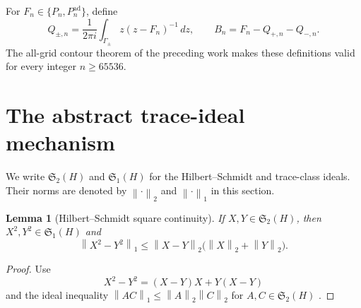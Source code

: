 \documentclass[11pt]{article}
\newtheorem{lemma}[theorem]{Lemma}
\theoremstyle{definition}
\theoremstyle{remark}
\newcommand{\norm}[1]{\left\lVert #1\right\rVert}
\begin{document}
For $F_n\in\{P_n,P_n^{\mathrm{ad}}\}$, define
\begin{equation}
 Q_{\pm,n}
 =\frac{1}{2\pi i}\int_{\Gamma_\pm}
 z(z-F_n)^{-1}\,dz,
 \qquad
 B_n=F_n-Q_{+,n}-Q_{-,n}.
 \label{eq:discrete-bulk}
\end{equation}
The all-grid contour theorem of the preceding work makes these definitions
valid for every integer $n\ge65536$.

\section{The abstract trace-ideal mechanism}
\label{sec:abstract}

We write $\mathfrak S_2(H)$ and $\mathfrak S_1(H)$ for the
Hilbert--Schmidt and trace-class ideals.  Their norms are denoted by
$\norm{\cdot}_2$ and $\norm{\cdot}_1$ in this section.

\begin{lemma}[Hilbert--Schmidt square continuity]
\label{lem:square-continuity}
If $X,Y\in\mathfrak S_2(H)$, then $X^2,Y^2\in\mathfrak S_1(H)$ and
\begin{equation}
 \norm{X^2-Y^2}_1
 \le \norm{X-Y}_2\bigl(\norm X_2+\norm Y_2\bigr).
 \label{eq:square-continuity}
\end{equation}
\end{lemma}

\begin{proof}
Use
\[
 X^2-Y^2=(X-Y)X+Y(X-Y)
\]
and the ideal inequality
$\norm{AC}_1\le\norm A_2\norm C_2$ for
$A,C\in\mathfrak S_2(H)$ \citep{Simon2005,GohbergKrein1969}.
\end{proof}
\end{document}

